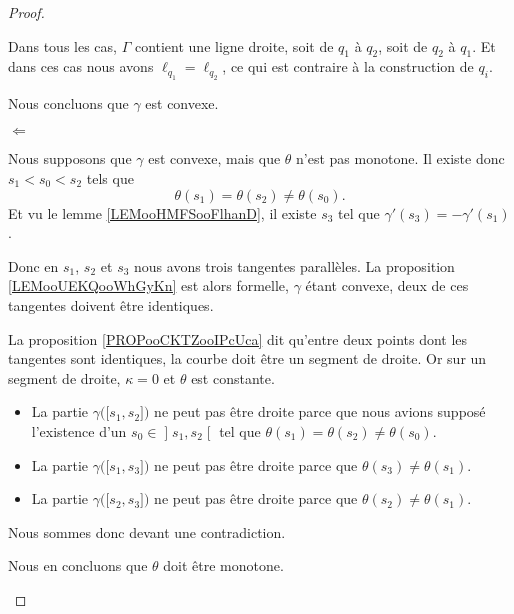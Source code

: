 \begin{proof}
\begin{subproof}
        Dans tous les cas, \( \Gamma\) contient une ligne droite, soit de \( q_1\) à \( q_2\), soit de \( q_2\) à \( q_1\). Et dans ces cas nous avons \( \ell_{q_1}=\ell_{q_2}\), ce qui est contraire à la construction de \( q_i\). 

        Nous concluons que \( \gamma\) est convexe.

        \item[\( \Leftarrow\)]

            Nous supposons que \( \gamma\) est convexe, mais que \( \theta\) n'est pas monotone. Il existe donc \( s_1<s_0<s_2\) tels que
            \begin{equation}
                \theta(s_1)=\theta(s_2)\neq \theta(s_0).
            \end{equation}
            Et vu le lemme \ref{LEMooHMFSooFlhanD}, il existe \( s_3\) tel que \( \gamma'(s_3)=-\gamma'(s_1)\).

            Donc en \( s_1\), \( s_2\) et \( s_3\) nous avons trois tangentes parallèles. La proposition \ref{LEMooUEKQooWhGyKn} est alors formelle, \( \gamma\) étant convexe, deux de ces tangentes doivent être identiques.

            La proposition \ref{PROPooCKTZooIPcUca} dit qu'entre deux points dont les tangentes sont identiques, la courbe doit être un segment de droite. Or sur un segment de droite, \( \kappa=0\) et \( \theta\) est constante.

            \begin{itemize}
                \item 
            La partie \( \gamma\big( \mathopen[ s_1 , s_2 \mathclose] \big)\) ne peut pas être droite parce que nous avions supposé l'existence d'un \( s_0\in \mathopen] s_1 , s_2 \mathclose[\) tel que \( \theta(s_1)=\theta(s_2)\neq \theta(s_0)\).

            \item
            La partie \( \gamma\big( \mathopen[ s_1 , s_3 \mathclose] \big)\) ne peut pas être droite parce que \( \theta(s_3)\neq \theta(s_1)\).
            \item
            La partie \( \gamma\big( \mathopen[ s_2 , s_3 \mathclose] \big)\) ne peut pas être droite parce que \( \theta(s_2)\neq \theta(s_1)\).
            \end{itemize}
            Nous sommes donc devant une contradiction.

            Nous en concluons que \( \theta\) doit être monotone.
    \end{subproof}
\end{proof}

